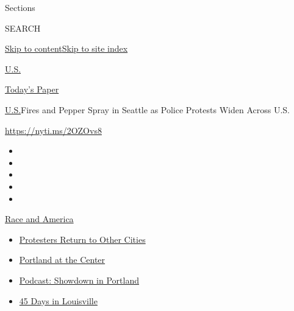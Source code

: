 Sections

SEARCH

\protect\hyperlink{site-content}{Skip to
content}\protect\hyperlink{site-index}{Skip to site index}

\href{https://www.nytimes3xbfgragh.onion/section/us}{U.S.}

\href{https://myaccount.nytimes3xbfgragh.onion/auth/login?response_type=cookie\&client_id=vi}{}

\href{https://www.nytimes3xbfgragh.onion/section/todayspaper}{Today's
Paper}

\href{/section/us}{U.S.}\textbar{}Fires and Pepper Spray in Seattle as
Police Protests Widen Across U.S.

\url{https://nyti.ms/2OZOvs8}

\begin{itemize}
\item
\item
\item
\item
\item
\end{itemize}

\href{https://www.nytimes3xbfgragh.onion/news-event/george-floyd-protests-minneapolis-new-york-los-angeles?action=click\&pgtype=Article\&state=default\&region=TOP_BANNER\&context=storylines_menu}{Race
and America}

\begin{itemize}
\tightlist
\item
  \href{https://www.nytimes3xbfgragh.onion/2020/07/26/us/protests-portland-seattle-trump.html?action=click\&pgtype=Article\&state=default\&region=TOP_BANNER\&context=storylines_menu}{Protesters
  Return to Other Cities}
\item
  \href{https://www.nytimes3xbfgragh.onion/2020/07/24/us/portland-oregon-protests-white-race.html?action=click\&pgtype=Article\&state=default\&region=TOP_BANNER\&context=storylines_menu}{Portland
  at the Center}
\item
  \href{https://www.nytimes3xbfgragh.onion/2020/07/23/podcasts/the-daily/portland-protests.html?action=click\&pgtype=Article\&state=default\&region=TOP_BANNER\&context=storylines_menu}{Podcast:
  Showdown in Portland}
\item
  \href{https://www.nytimes3xbfgragh.onion/interactive/2020/07/16/us/black-lives-matter-protests-louisville-breonna-taylor.html?action=click\&pgtype=Article\&state=default\&region=TOP_BANNER\&context=storylines_menu}{45
  Days in Louisville}
\end{itemize}

